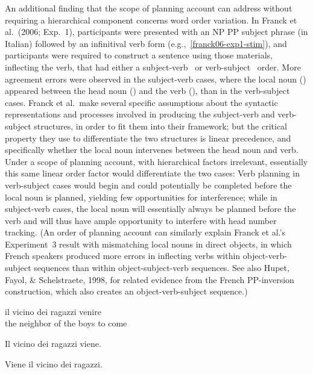 \documentclass[12pt,titlepage]{article}
\newcommand{\IGNORE}[1]{} %
\begin{document}
An additional finding that the scope of planning account can address
without requiring a hierarchical component concerns word order variation.
In Franck et al.\ (2006; Exp.~1), participants were presented with an NP PP
subject phrase (in Italian) followed by an infinitival verb form
(e.g.,~\ref{franck06-exp1-stim}), and participants were required to
construct a sentence using those materials, inflecting the verb, that had
either a subject-verb~ or
verb-subject~ order.  More agreement errors were
observed in the subject-verb cases, where the local noun ()
appeared between the head noun () and the verb (),
than in the verb-subject cases.  Franck et al.\ make several specific
assumptions about the syntactic representations and processes involved in
producing the subject-verb and verb-subject structures, in order to fit
them into their framework; but the critical property they use to
differentiate the two structures is linear precedence, and specifically
whether the local noun intervenes between the head noun and verb.\IGNORE{
argue that the low error rate in the VS ordering was due to the subject
remaining VP-internal (i.e., never raised to the Spec of the AgrS node),
and, thus agreement is only established by AGREE and is not subject to a
Spec-Head check which is "assumed to reinforce the morphological
realization of agreement" (p.  183).} Under a scope of planning account,
with hierarchical factors irrelevant, essentially this same linear order
factor would differentiate the two cases: Verb planning in verb-subject
cases would begin and could potentially be completed before the local noun
is planned, yielding few opportunities for interference; while in
subject-verb cases, the local noun will essentially always be planned
before the verb and will thus have ample opportunity to interfere with head
number tracking.  (An order of planning account can similarly explain
Franck et al.'s Experiment~3 result with mismatching local nouns in direct
objects, in which French speakers produced more errors in inflecting verbs
within object-verb-subject sequences than within object-subject-verb
sequences.  See also Hupet, Fayol, \& Schelstraete, 1998, for related
evidence from the French PP-inversion construction, which also creates an
object-verb-subject sequence.)

\begin{myexample}
\label{franck06-exp1}
\begin{examples}
    
    \item \label{franck06-exp1-stim} il vicino dei ragazzi 
    \hfill venire \hspace{19em} \\
    the neighbor of the boys \hfill to come \hspace{19em} 
    
    \item \label{franck06-sv} Il vicino dei ragazzi viene.
    \item \label{franck06-vs} Viene il vicino dei ragazzi.

\end{examples}
\end{myexample}
\end{document}
